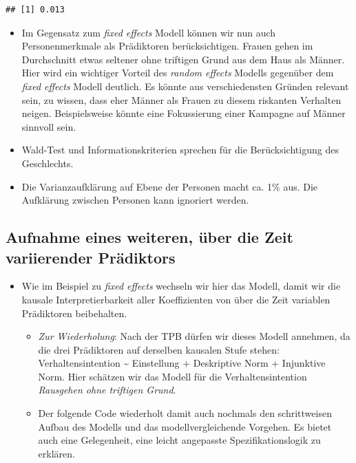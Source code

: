 \documentclass[
]{book}
\providecommand{\tightlist}{%
  \setlength{\itemsep}{0pt}\setlength{\parskip}{0pt}}
\begin{document}
\begin{verbatim}
## [1] 0.013
\end{verbatim}

\begin{itemize}
\tightlist
\item
  Im Gegensatz zum \emph{fixed effects} Modell können wir nun auch Personenmerkmale als Prädiktoren berücksichtigen. Frauen gehen im Durchschnitt etwas seltener ohne triftigen Grund aus dem Haus als Männer. Hier wird ein wichtiger Vorteil des \emph{random effects} Modells gegenüber dem \emph{fixed effects} Modell deutlich. Es könnte aus verschiedensten Gründen relevant sein, zu wissen, dass eher Männer als Frauen zu diesem riskanten Verhalten neigen. Beispielsweise könnte eine Fokussierung einer Kampagne auf Männer sinnvoll sein.
\item
  Wald-Test und Informationskriterien sprechen für die Berücksichtigung des Geschlechts.
\item
  Die Varianzaufklärung auf Ebene der Personen macht ca. 1\% aus. Die Aufklärung zwischen Personen kann ignoriert werden.
\end{itemize}

\hypertarget{aufnahme-eines-weiteren-uxfcber-die-zeit-variierender-pruxe4diktors}{%
\subsection*{Aufnahme eines weiteren, über die Zeit variierender Prädiktors}\label{aufnahme-eines-weiteren-uxfcber-die-zeit-variierender-pruxe4diktors}}

\begin{itemize}
\tightlist
\item
  Wie im Beispiel zu \emph{fixed effects} wechseln wir hier das Modell, damit wir die kausale Interpretierbarkeit aller Koeffizienten von über die Zeit variablen Prädiktoren beibehalten.

  \begin{itemize}
  \tightlist
  \item
    \emph{Zur Wiederholung}: Nach der TPB dürfen wir dieses Modell annehmen, da die drei Prädiktoren auf derselben kausalen Stufe stehen: Verhaltensintention \textasciitilde{} Einstellung + Deskriptive Norm + Injunktive Norm. Hier schätzen wir das Modell für die Verhaltensintention \emph{Rausgehen ohne triftigen Grund}.
  \item
    Der folgende Code wiederholt damit auch nochmals den schrittweisen Aufbau des Modells und das modellvergleichende Vorgehen. Es bietet auch eine Gelegenheit, eine leicht angepasste Spezifikationslogik zu erklären.
  \end{itemize}
\end{itemize}
\end{document}
